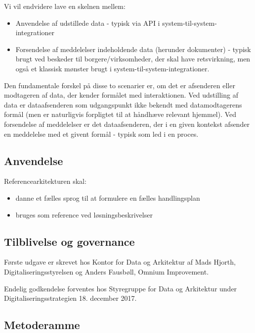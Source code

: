 Vi vil endvidere lave en skelnen mellem:

\begin{itemize}
\tightlist
\item
  Anvendelse af udstillede data - typisk via API i
  system-til-system-integrationer
\item
  Forsendelse af meddelelser indeholdende data (herunder dokumenter) -
  typisk brugt ved beskeder til borgere/virksomheder, der skal have
  retsvirkning, men også et klassisk mønster brugt i
  system-til-system-integrationer.
\end{itemize}

Den fundamentale forskel på disse to scenarier er, om det er afsenderen
eller modtageren af data, der kender formålet med interaktionen. Ved
udstilling af data er dataafsenderen som udgangspunkt ikke bekendt med
datamodtagerens formål (men er naturligvis forpligtet til at håndhæve
relevant hjemmel). Ved forsendelse af meddelelser er det dataafsenderen,
der i en given kontekst afsender en meddelelse med et givent formål -
typisk som led i en proces.

\subsection{Anvendelse}\label{anvendelse}

Referencearkitekturen skal:

\begin{itemize}
\tightlist
\item
  danne et fælles sprog til at formulere en fælles handlingsplan
\item
  bruges som reference ved løsningsbeskrivelser
\end{itemize}

\subsection{Tilblivelse og governance}\label{tilblivelse-og-governance}

Første udgave er skrevet hos Kontor for Data og Arkitektur af Mads
Hjorth, Digitaliseringsstyrelsen og Anders Fausbøll, Omnium Improvement.

Endelig godkendelse forventes hos Styregruppe for Data og Arkitektur
under Digitaliseringsstrategien 18. december 2017.

\subsection{Metoderamme}\label{metoderamme}


